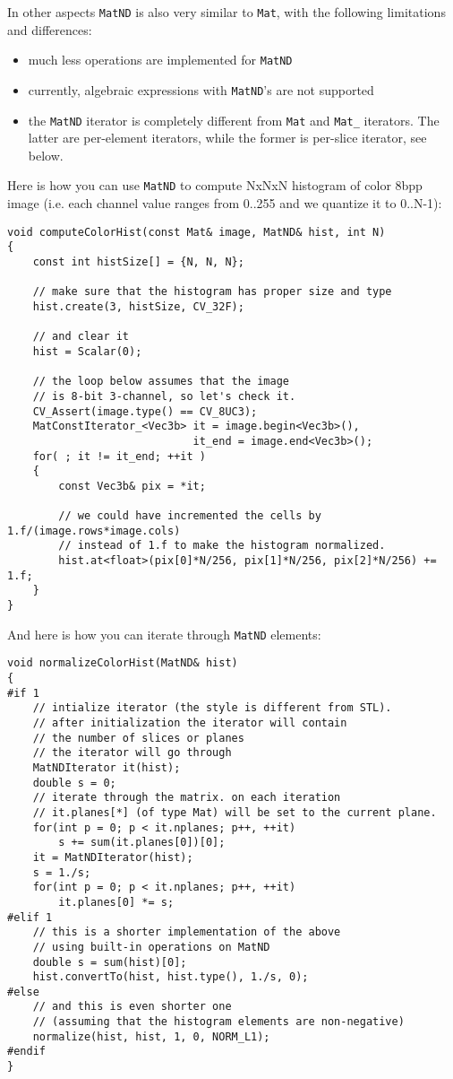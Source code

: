 In other aspects \texttt{MatND} is also very similar to \texttt{Mat}, with the following limitations and differences:
\begin{itemize}
    \item much less operations are implemented for \texttt{MatND}
    \item currently, algebraic expressions with \texttt{MatND}'s are not supported
    \item the \texttt{MatND} iterator is completely different from \texttt{Mat} and \texttt{Mat\_} iterators. The latter are per-element iterators, while the former is per-slice iterator, see below.
\end{itemize}

Here is how you can use \texttt{MatND} to compute NxNxN histogram of color 8bpp image (i.e. each channel value ranges from 0..255 and we quantize it to 0..N-1):

\begin{lstlisting}
void computeColorHist(const Mat& image, MatND& hist, int N)
{
    const int histSize[] = {N, N, N};
    
    // make sure that the histogram has proper size and type
    hist.create(3, histSize, CV_32F);
    
    // and clear it
    hist = Scalar(0);
    
    // the loop below assumes that the image
    // is 8-bit 3-channel, so let's check it.
    CV_Assert(image.type() == CV_8UC3);
    MatConstIterator_<Vec3b> it = image.begin<Vec3b>(),
                             it_end = image.end<Vec3b>();    
    for( ; it != it_end; ++it )
    {
        const Vec3b& pix = *it;
        
        // we could have incremented the cells by 1.f/(image.rows*image.cols)
        // instead of 1.f to make the histogram normalized.
        hist.at<float>(pix[0]*N/256, pix[1]*N/256, pix[2]*N/256) += 1.f;
    }
}
\end{lstlisting}

And here is how you can iterate through \texttt{MatND} elements:

\begin{lstlisting}
void normalizeColorHist(MatND& hist)
{
#if 1    
    // intialize iterator (the style is different from STL).
    // after initialization the iterator will contain
    // the number of slices or planes
    // the iterator will go through
    MatNDIterator it(hist);
    double s = 0;
    // iterate through the matrix. on each iteration
    // it.planes[*] (of type Mat) will be set to the current plane.
    for(int p = 0; p < it.nplanes; p++, ++it)
        s += sum(it.planes[0])[0];
    it = MatNDIterator(hist);
    s = 1./s;
    for(int p = 0; p < it.nplanes; p++, ++it)
        it.planes[0] *= s;
#elif 1
    // this is a shorter implementation of the above
    // using built-in operations on MatND
    double s = sum(hist)[0];
    hist.convertTo(hist, hist.type(), 1./s, 0);
#else
    // and this is even shorter one
    // (assuming that the histogram elements are non-negative)
    normalize(hist, hist, 1, 0, NORM_L1);
#endif
}
\end{lstlisting}

